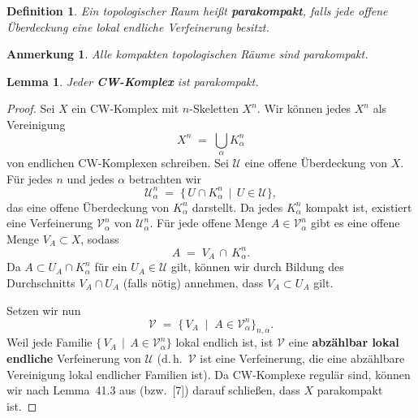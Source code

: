 \documentclass[12pt]{article}
\numberwithin{conj}{section}
\newtheorem{definition}[conj]{Definition}
\newtheorem{remark}[conj]{Anmerkung}
\newtheorem{lemma}[conj]{Lemma}
\begin{document}
    \begin{definition}
        Ein topologischer Raum heißt \textbf{parakompakt}, falls jede offene Überdeckung
        eine lokal endliche Verfeinerung besitzt.
    \end{definition}

    \begin{remark}
        Alle kompakten topologischen Räume sind parakompakt.
    \end{remark}

    \begin{lemma}
        Jeder \textbf{CW-Komplex} ist parakompakt.
    \end{lemma}

    \begin{proof}
        Sei $X$ ein CW-Komplex mit $n$-Skeletten $X^{n}$. Wir können jedes $X^{n}$
        als Vereinigung
        \[
            X^{n} \;=\; \bigcup_{\alpha}K^{n}_{\alpha}
        \]
        von endlichen CW-Komplexen schreiben. Sei $\mathcal{U}$ eine offene Überdeckung
        von $X$. Für jedes $n$ und jedes $\alpha$ betrachten wir
        \[
            \mathcal{U}^{n}_{\alpha} \;=\; \{\,U \cap K^{n}_{\alpha}\,\mid\, U \in \mathcal{U}
            \},
        \]
        das eine offene Überdeckung von $K^{n}_{\alpha}$ darstellt. Da jedes $K^{n}_{\alpha}$
        kompakt ist, existiert eine Verfeinerung $\mathcal{V}^{n}_{\alpha}$ von
        $\mathcal{U}^{n}_{\alpha}$. Für jede offene Menge $A \in \mathcal{V}^{n}_{\alpha}$
        gibt es eine offene Menge $V_{A} \subset X$, sodass
        \[
            A \;=\; V_{A} \,\cap\, K^{n}_{\alpha}.
        \]
        Da $A \subset U_{A} \cap K^{n}_{\alpha}$ für ein $U_{A} \in \mathcal{U}$
        gilt, können wir durch Bildung des Durchschnitts $V_{A} \cap U_{A}$ (falls
        nötig) annehmen, dass $V_{A} \subset U_{A}$ gilt.

        Setzen wir nun
        \[
            \mathcal{V}\;=\; \bigl\{\,V_{A} \;\mid\; A \in \mathcal{V}^{n}_{\alpha}\bigr
            \}_{n,\alpha}.
        \]
        Weil jede Familie $\{\,V_{A} \,\mid\, A \in \mathcal{V}^{n}_{\alpha}\}$
        lokal endlich ist, ist $\mathcal{V}$ eine \textbf{abzählbar lokal endliche}
        Verfeinerung von $\mathcal{U}$ (d.\,h.\ $\mathcal{V}$ ist eine Verfeinerung,
        die eine abzählbare Vereinigung lokal endlicher Familien ist). Da CW-Komplexe
        regulär sind, können wir nach Lemma~41.3 aus \cite{hatcher2001} (bzw.\ [7])
        darauf schließen, dass $X$ parakompakt ist.
    \end{proof}
\end{document}
